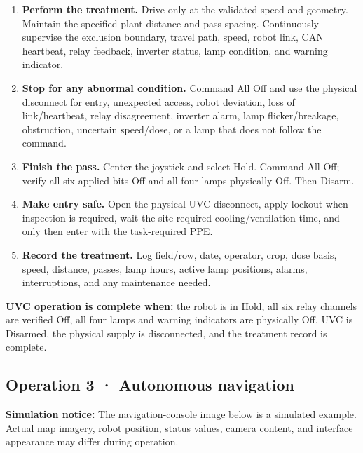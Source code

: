 \documentclass[
  10pt,
  letterpaper,
  openany]{report}
\begin{document}
\begin{enumerate}
  and the external warning indication is active. Never approach a
  dark-looking lamp while other lamps are energized.
\item
  \textbf{Perform the treatment.} Drive only at the validated speed and
  geometry. Maintain the specified plant distance and pass spacing.
  Continuously supervise the exclusion boundary, travel path, speed,
  robot link, CAN heartbeat, relay feedback, inverter status, lamp
  condition, and warning indicator.
\item
  \textbf{Stop for any abnormal condition.} Command All Off and use the
  physical disconnect for entry, unexpected access, robot deviation,
  loss of link/heartbeat, relay disagreement, inverter alarm, lamp
  flicker/breakage, obstruction, uncertain speed/dose, or a lamp that
  does not follow the command.
\item
  \textbf{Finish the pass.} Center the joystick and select Hold. Command
  All Off; verify all six applied bits Off and all four lamps physically
  Off. Then Disarm.
\item
  \textbf{Make entry safe.} Open the physical UVC disconnect, apply
  lockout when inspection is required, wait the site-required
  cooling/ventilation time, and only then enter with the task-required
  PPE.
\item
  \textbf{Record the treatment.} Log field/row, date, operator, crop,
  dose basis, speed, distance, passes, lamp hours, active lamp
  positions, alarms, interruptions, and any maintenance needed.
\end{enumerate}

\textbf{UVC operation is complete when:} the robot is in Hold, all six
relay channels are verified Off, all four lamps and warning indicators
are physically Off, UVC is Disarmed, the physical supply is
disconnected, and the treatment record is complete.

\subsection{Operation 3 · Autonomous navigation}\label{operations-auto}

\begin{manualnotice}

\textbf{Simulation notice:} The navigation-console image below is a
simulated example. Actual map imagery, robot position, status values,
camera content, and interface appearance may differ during operation.

\end{manualnotice}
\end{document}
